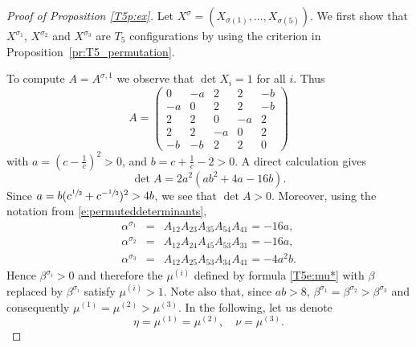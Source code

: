 \documentclass[10pt,a4paper]{amsart}
\begin{document}
\begin{proof}[Proof of Proposition \ref{T5p:ex}]
Let $X^\sigma = (X_{\sigma(1)}, \ldots, X_{\sigma(5)})$. 
We first show that $X^{\sigma_1}$, $X^{\sigma_2}$ and $X^{\sigma_3}$ are
$T_5$ configurations by using the criterion in Proposition~\ref{pr:T5_permutation}.



To compute $A = A^{\sigma, 1}$ we observe that 
 $\det X_i=1$ for all $i$. 
  Thus
\begin{equation*}
A=\begin{pmatrix}
	0&-a&2&2&-b\\ -a&0&2&2&-b\\2&2&0&-a&2\\2&2&-a&0&2\\-b&-b&2&2&0
\end{pmatrix}	
\end{equation*}
with $a=(c-\tfrac1c)^2>0$, and $b=c+\tfrac1c-2>0$. 
A direct calculation gives
$$
\det A=2a^2(ab^2+4a-16b).
$$
Since $a=b(c^{\sfrac12}+c^{-\sfrac12})^2> 4b$, we see that $\det A>0$. 
Moreover, using the notation from \eqref{e:permuteddeterminants},
\begin{eqnarray*} \alpha^{\sigma_1} &=& A_{12} A_{23} A_{35} A_{54} A_{41} = - 16 a, \\
 \alpha^{\sigma_2} &=& A_{12} A_{24} A_{45} A_{53} A_{31} = - 16 a, \\
  \alpha^{\sigma_3} &=& A_{12} A_{25} A_{53} A_{34} A_{41} = - 4 a^2 b.
  \end{eqnarray*}
Hence $\beta^{\sigma_i}>0$ and therefore the $\mu^{(i)}$ defined by formula \eqref{T5e:mu*}  with $\beta$ replaced by
$\beta^{\sigma_i}$ satisfy $\mu^{(i)}>1$. 
Note also that, since $ab>8$, $\beta^{\sigma_1}=\beta^{\sigma_2}>\beta^{\sigma_3}$ 
and consequently $\mu^{(1)}=\mu^{(2)}>\mu^{(3)}$. In  the following, let us denote
$$
\eta=\mu^{(1)}=\mu^{(2)},\quad \nu=\mu^{(3)}.
$$


\end{proof}
\end{document}
